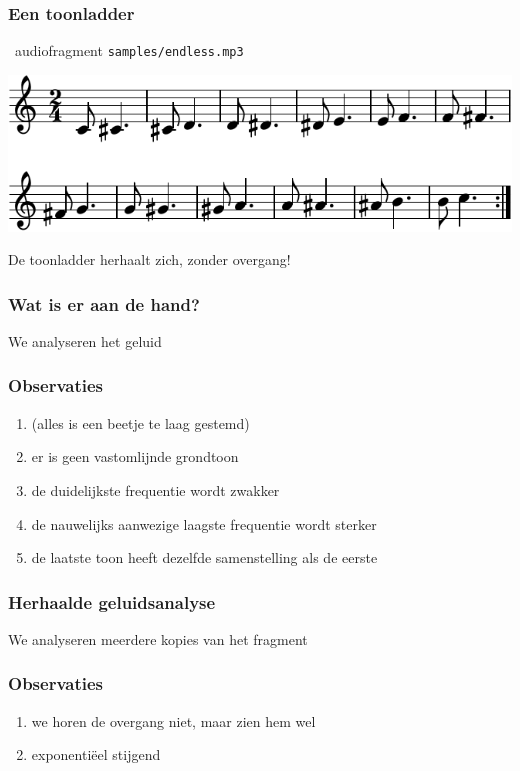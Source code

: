 \documentclass[compress, darktitle, framenumber, totalframenumber]{beamer}
\begin{document}
\begin{frame}
  \frametitle{Een toonladder}

  \begin{block}{\twonotes\ audiofragment}
    \texttt{samples/endless.mp3}
  \end{block}
  \pause
  \begin{center}
    \includegraphics{scores/endless-cropped}
  \end{center}
  \pause
  De toonladder \alert{herhaalt} zich, zonder overgang!
\end{frame}

\begin{frame}
  \frametitle{Wat is er aan de hand?}

  We analyseren het geluid
\end{frame}

\begin{frame}
  \frametitle{Observaties}

  \begin{enumerate}
    \item (alles is een beetje te laag gestemd)
    \item er is geen vastomlijnde grondtoon
    \item de duidelijkste frequentie wordt \alert{zwakker}
    \item de nauwelijks aanwezige laagste frequentie wordt \alert{sterker}
    \item de laatste toon heeft dezelfde samenstelling als de eerste
  \end{enumerate}
\end{frame}

\begin{frame}
  \frametitle{Herhaalde geluidsanalyse}

  We analyseren meerdere kopies van het fragment
\end{frame}

\begin{frame}
  \frametitle{Observaties}

  \begin{enumerate}
    \item we horen de overgang niet, maar \alert{zien} hem wel
    \item exponenti\"eel stijgend
  \end{enumerate}
\end{frame}
\end{document}
